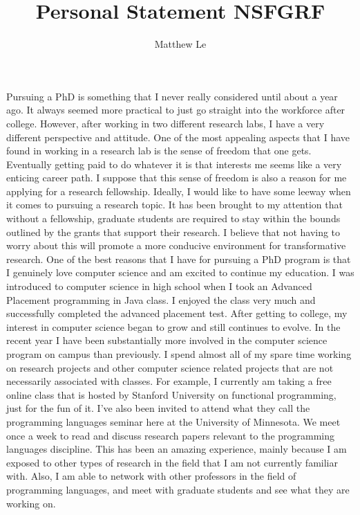 \documentclass[a4paper,12pt]{article}
\title{Personal Statement NSFGRF}
\author{Matthew Le}
\newcommand{\tab}{\hspace*{2em}}
\begin{document}
\maketitle
Pursuing a PhD is something that I never really considered until about a year ago.  It always seemed more practical to just go straight into the workforce after college.  However, after working in two different research labs, I have a very different perspective and attitude.  One of the most appealing aspects that I have found in working in a research lab is the sense of freedom that one gets.  Eventually getting paid to do whatever it is that interests me seems like a very enticing career path.  I suppose that this sense of freedom is also a reason for me applying for a research fellowship.  Ideally, I would like to have some leeway when it comes to pursuing a research topic.  It has been brought to my attention that without a fellowship, graduate students are required to stay within the bounds outlined by the grants that support their research.  I believe that not having to worry about this will promote a more conducive environment for transformative research.
\newline
\tab One of the best reasons that I have for pursuing a PhD program is that I genuinely love computer science and am excited to continue my education.  I was introduced to computer science in high school when I took an Advanced Placement programming in Java class.  I enjoyed the class very much and successfully completed the advanced placement test.  After getting to college, my interest in computer science began to grow and still continues to evolve.  In the recent year I have been substantially more involved in the computer science program on campus than previously.  I spend almost all of my spare time working on research projects and other computer science related projects that are not necessarily associated with classes.  For example, I currently am taking a free online class that is hosted by Stanford University on functional programming, just for the fun of it.  I've also been invited to attend what they call the programming languages seminar here at the University of Minnesota.  We meet once a week to read and discuss research papers relevant to the programming languages discipline.  This has been an amazing experience, mainly because I am exposed to other types of research in the field that I am not currently familiar with. Also, I am able to network with other professors in the field of programming languages, and meet with graduate students and see what they are working on. \newline
\end{document}
